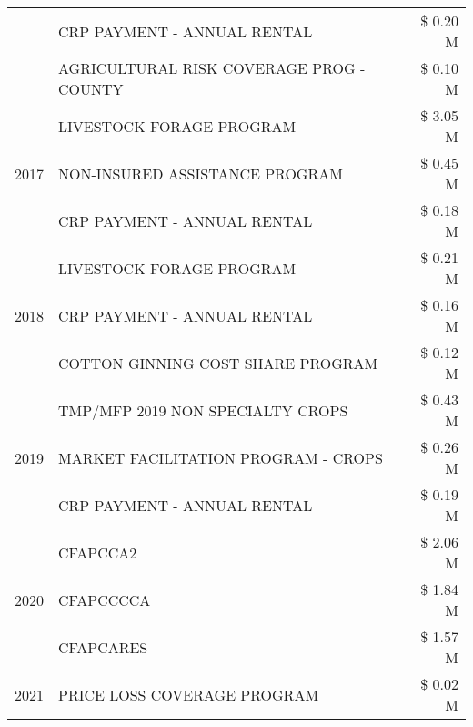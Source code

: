\begin{tabular}{llr}
 & CRP PAYMENT - ANNUAL RENTAL                   & \$ 0.20 M \\
 & AGRICULTURAL RISK COVERAGE PROG - COUNTY      & \$ 0.10 M \\
\cline{1-3}
\multirow[t]{3}{*}{2017} & LIVESTOCK FORAGE PROGRAM & \$ 3.05 M \\
 & NON-INSURED ASSISTANCE PROGRAM & \$ 0.45 M \\
 & CRP PAYMENT - ANNUAL RENTAL & \$ 0.18 M \\
\cline{1-3}
\multirow[t]{3}{*}{2018} & LIVESTOCK FORAGE PROGRAM & \$ 0.21 M \\
 & CRP PAYMENT - ANNUAL RENTAL & \$ 0.16 M \\
 & COTTON GINNING COST SHARE PROGRAM & \$ 0.12 M \\
\cline{1-3}
\multirow[t]{3}{*}{2019} & TMP/MFP 2019 NON SPECIALTY CROPS & \$ 0.43 M \\
 & MARKET FACILITATION PROGRAM - CROPS & \$ 0.26 M \\
 & CRP PAYMENT - ANNUAL RENTAL & \$ 0.19 M \\
\cline{1-3}
\multirow[t]{3}{*}{2020} & CFAPCCA2 & \$ 2.06 M \\
 & CFAPCCCCA & \$ 1.84 M \\
 & CFAPCARES & \$ 1.57 M \\
\cline{1-3}
2021 & PRICE LOSS COVERAGE PROGRAM & \$ 0.02 M \\
\cline{1-3}
\bottomrule
\end{tabular}
